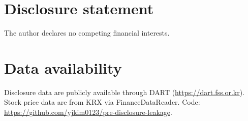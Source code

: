 \documentclass[12pt,a4paper]{article}
\begin{document}
\section*{Disclosure statement}
The author declares no competing financial interests.

\section*{Data availability}
Disclosure data are publicly available through DART (\url{https://dart.fss.or.kr}). Stock price data are from KRX via FinanceDataReader. Code: \url{https://github.com/yjkim0123/pre-disclosure-leakage}.



\end{document}
